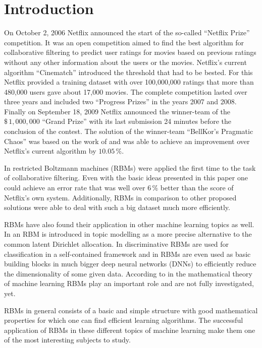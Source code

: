 \documentclass[crop=false,10pt]{standalone}
\begin{document}
  \section{Introduction} %
  \label{sec:introduction}
    On October 2, 2006 Netflix announced the start of the so-called \enquote{Netflix Prize} competition.
    It was an open competition aimed to find the best algorithm for collaborative filtering to predict user ratings for movies based on previous ratings without any other information about the users or the movies.
    Netflix's current algorithm \enquote{Cinematch} introduced the threshold that had to be bested.
    For this Netflix provided a training dataset with over 100,000,000 ratings that more than 480,000 users gave about 17,000 movies.
    The complete competition lasted over three years and included two \enquote{Progress Prizes} in the years 2007 and 2008.
    Finally on September 18, 2009 Netflix announced the winner-team of the $\$\, 1,000,000$ \enquote{Grand Prize} with its last submission 24 minutes before the conclusion of the contest.
    The solution of the winner-team \enquote{BellKor's Pragmatic Chaos} was based on the work of \cite{Hinton2007} and was able to achieve an improvement over Netflix's current algorithm by $10.05\,\%$.
    \cite{Hinton2007,NetflixPrize,NetflixPrizeDataset}

    In \cite{Hinton2007} restricted Boltzmann machines (RBMs) were applied the first time to the task of collaborative filtering.
    Even with the basic ideas presented in this paper one could achieve an error rate that was well over $6\,\%$ better than the score of Netflix's own system.
    Additionally, RBMs in comparison to other proposed solutions were able to deal with such a big dataset much more efficiently.
    \cite{Hinton2007}

    RBMs have also found their application in other machine learning topics as well.
    In \cite{Murphy2012} an RBM is introduced in topic modelling as a more precise alternative to the common latent Dirichlet allocation.
    In \cite{Larochelle2008} discriminative RBMs are used for classification in a self-contained framework and in \cite{Hinton2006} RBMs are even used as basic building blocks in much bigger deep neural networks (DNNs) to efficiently reduce the dimensionality of some given data.
    According to \cite{Montufar2018} in the mathematical theory of machine learning RBMs play an important role and are not fully investigated, yet.

    RBMs in general consists of a basic and simple structure with good mathematical properties for which one can find efficient learning algorithms.
    The successful application of RBMs in these different topics of machine learning make them one of the most interesting subjects to study.
\end{document}
